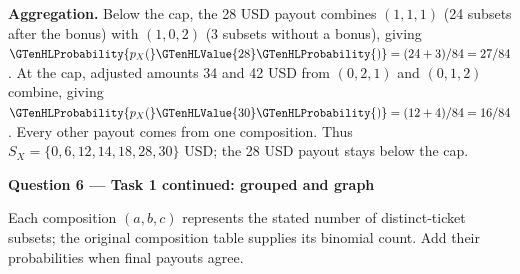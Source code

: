 \textbf{Aggregation.} Below the cap, the 28 USD payout combines $(1,1,1)$ (24 subsets after the bonus) with $(1,0,2)$ (3 subsets without a bonus), giving $\GTenHLProbability{p_X(}\GTenHLValue{28}\GTenHLProbability{)}=(24+3)/84=27/84$. At the cap, adjusted amounts 34 and 42 USD from $(0,2,1)$ and $(0,1,2)$ combine, giving $\GTenHLProbability{p_X(}\GTenHLValue{30}\GTenHLProbability{)}=(12+4)/84=16/84$. Every other payout comes from one composition. Thus $S_X=\{0,6,12,14,18,28,30\}$ USD; the 28 USD payout stays below the cap.
\par\vspace{3mm}\secInicio[][sec:q6]
\clearpage\textbf{Question 6 --- Task 1 continued: grouped  and graph}

Each composition $(a,b,c)$ represents the stated number of distinct-ticket subsets; the original composition table supplies its binomial count. Add their probabilities when final payouts agree.
